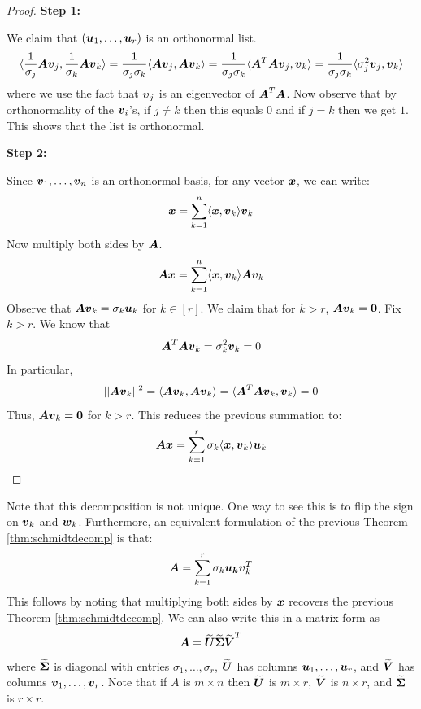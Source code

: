 \begin{proof}

\textbf{Step 1:}

    We claim that $(\boldsymbol{u}_1,\dots,\boldsymbol{u}_r)$ is an orthonormal list.
    \[
    \langle\frac{1}{\sigma_j}\boldsymbol{A}\boldsymbol{v}_j,\frac{1}{\sigma_k}\boldsymbol{A}\boldsymbol{v}_k\rangle=\frac{1}{\sigma_j\sigma_k}\langle\boldsymbol{A}\boldsymbol{v}_j,\boldsymbol{A}\boldsymbol{v}_k\rangle=\frac{1}{\sigma_j\sigma_k}\langle\boldsymbol{A}^T\boldsymbol{A}\boldsymbol{v}_j,\boldsymbol{v}_k\rangle=\frac{1}{\sigma_j\sigma_k}\langle\sigma_j^2\boldsymbol{v}_j,\boldsymbol{v}_k\rangle
    \]
    where we use the fact that $\boldsymbol{v}_j$ is an eigenvector of $\boldsymbol{A}^T\boldsymbol{A}$. Now observe that by orthonormality of the $\boldsymbol{v}_i$'s, if $j\neq k$ then this equals $0$ and if $j=k$ then we get $1$. This shows that the list is orthonormal.

\textbf{Step 2:}

    Since $\boldsymbol{v}_1,\dots,\boldsymbol{v}_n$ is an orthonormal basis, for any vector $\boldsymbol{x}$, we can write:
    \[
    \boldsymbol{x}=\sum_{k=1}^n\langle\boldsymbol{x},\boldsymbol{v}_k\rangle\boldsymbol{v}_k
    \]
    Now multiply both sides by $\boldsymbol{A}$.
    \[
    \boldsymbol{A}\boldsymbol{x}=\sum_{k=1}^n\langle\boldsymbol{x},\boldsymbol{v}_k\rangle\boldsymbol{A}\boldsymbol{v}_k
    \]
    Observe that $\boldsymbol{A}\boldsymbol{v}_k=\sigma_k\boldsymbol{u}_k$ for $k\in [r]$. We claim that for $k>r$, $\boldsymbol{A}\boldsymbol{v}_k=\boldsymbol{0}$. Fix $k>r$. We know that
    \[
    \boldsymbol{A}^T\boldsymbol{A}\boldsymbol{v}_k=\sigma_k^2\boldsymbol{v}_k=0
    \]
    In particular,
    \[
    ||\boldsymbol{A}\boldsymbol{v}_k||^2=\langle\boldsymbol{A}\boldsymbol{v}_k,\boldsymbol{A}\boldsymbol{v}_k\rangle=\langle\boldsymbol{A}^T\boldsymbol{A}\boldsymbol{v}_k,\boldsymbol{v}_k\rangle=0
    \]
    Thus, $\boldsymbol{A}\boldsymbol{v}_k=\boldsymbol{0}$ for $k>r$. This reduces the previous summation to:
    \[
    \boldsymbol{A}\boldsymbol{x}=\sum_{k=1}^r\sigma_k\langle\boldsymbol{x},\boldsymbol{v}_k\rangle\boldsymbol{u}_k
    \]
\end{proof}
Note that this decomposition is not unique. One way to see this is to flip the sign on $\boldsymbol{v}_k$ and $\boldsymbol{w}_k$. Furthermore, an equivalent formulation of the previous Theorem \ref{thm:schmidtdecomp} is that:
\[
\boldsymbol{A}=\sum_{k=1}^r\sigma_k\boldsymbol{u_k}\boldsymbol{v}_k^T
\]
This follows by noting that multiplying both sides by $\boldsymbol{x}$ recovers the previous Theorem \ref{thm:schmidtdecomp}. We can also write this in a matrix form as
\begin{equation}\label{eq:schdmit_decomp_matrix}
    \boldsymbol{A}=\widetilde{\boldsymbol{U}}\widetilde{\boldsymbol{\Sigma}}\widetilde{\boldsymbol{V}}^T
\end{equation}
where $\widetilde{\boldsymbol{\Sigma}}$ is diagonal with entries $\sigma_1,\dots,\sigma_r$, $\widetilde{\boldsymbol{U}}$ has columns $\boldsymbol{u}_1,\dots,\boldsymbol{u}_r$, and $\widetilde{\boldsymbol{V}}$ has columns $\boldsymbol{v}_1,\dots,\boldsymbol{v}_r$. Note that if $A$ is $m\times n$ then $\widetilde{\boldsymbol{U}}$ is $m\times r$, $\widetilde{\boldsymbol{V}}$ is $n\times r$, and $\widetilde{\boldsymbol{\Sigma}}$ is $r\times r$.

